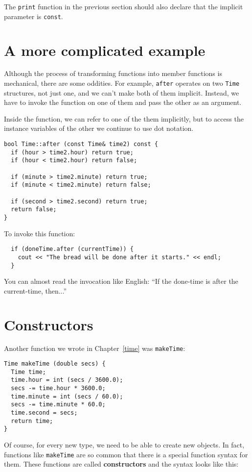 The {\tt print} function in the previous section should also
declare that the implicit parameter is {\tt const}.

\section {A more complicated example}

Although the process of transforming functions into member
functions is mechanical, there are some oddities.  For example,
{\tt after} operates on two {\tt Time} structures, not just
one, and we can't make both of them implicit.  Instead, we have
to invoke the function on one of them and pass the other as
an argument.

Inside the function, we can refer to one of the them implicitly,
but to access the instance variables of the other we continue
to use dot notation.

\begin{verbatim}
bool Time::after (const Time& time2) const {
  if (hour > time2.hour) return true;
  if (hour < time2.hour) return false;

  if (minute > time2.minute) return true;
  if (minute < time2.minute) return false;

  if (second > time2.second) return true;
  return false;
}
\end{verbatim}
%
To invoke this function:

\begin{verbatim}
  if (doneTime.after (currentTime)) {
    cout << "The bread will be done after it starts." << endl;
  }
\end{verbatim}
%
You can almost read the invocation like English: ``If the
done-time is after the current-time, then...''

\section{Constructors}

Another function we wrote in Chapter~\ref{time} was
{\tt makeTime}:

\begin{verbatim}
Time makeTime (double secs) {
  Time time;
  time.hour = int (secs / 3600.0);
  secs -= time.hour * 3600.0;
  time.minute = int (secs / 60.0);
  secs -= time.minute * 60.0;
  time.second = secs;
  return time;
}
\end{verbatim}
%
Of course, for every new type, we need to be able to create
new objects.  In fact, functions like {\tt makeTime} are so
common that there is a special function syntax for them.  These
functions are called {\bf constructors} and the syntax looks
like this:

